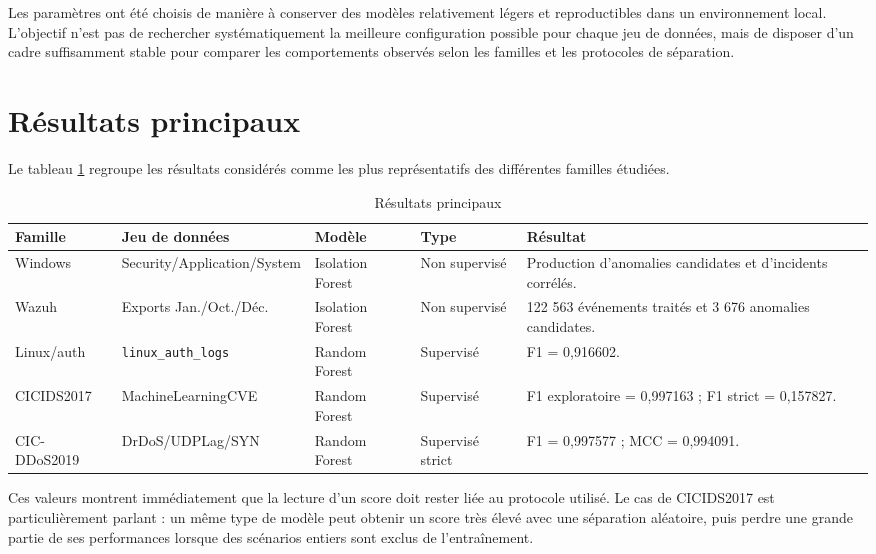 Les paramètres ont été choisis de manière à conserver des modèles relativement légers et reproductibles dans un environnement local. L'objectif n'est pas de rechercher systématiquement la meilleure configuration possible pour chaque jeu de données, mais de disposer d'un cadre suffisamment stable pour comparer les comportements observés selon les familles et les protocoles de séparation.

\section{Résultats principaux}

Le tableau \ref{tab:main-results} regroupe les résultats considérés comme les plus représentatifs des différentes familles étudiées.

\begin{table}[H]
\centering
\caption{Résultats principaux}
\label{tab:main-results}
\scriptsize

\begin{tabularx}{\textwidth}{p{2.2cm}p{2.8cm}p{2.3cm}p{2cm}X}
\toprule
\textbf{Famille} &
\textbf{Jeu de données} &
\textbf{Modèle} &
\textbf{Type} &
\textbf{Résultat}
\tabularnewline
\midrule

Windows &
Security/Application/System &
Isolation Forest &
Non supervisé &
Production d'anomalies candidates et d'incidents corrélés.
\tabularnewline

Wazuh &
Exports Jan./Oct./Déc. &
Isolation Forest &
Non supervisé &
122 563 événements traités et 3 676 anomalies candidates.
\tabularnewline

Linux/auth &
\texttt{linux\_auth\_logs} &
Random Forest &
Supervisé &
F1 = 0,916602.
\tabularnewline

CICIDS2017 &
MachineLearningCVE &
Random Forest &
Supervisé &
F1 exploratoire = 0,997163 ; F1 strict = 0,157827.
\tabularnewline

CIC-DDoS2019 &
DrDoS/UDPLag/SYN &
Random Forest &
Supervisé strict &
F1 = 0,997577 ; MCC = 0,994091.
\tabularnewline

\bottomrule
\end{tabularx}
\end{table}

Ces valeurs montrent immédiatement que la lecture d'un score doit rester liée au protocole utilisé. Le cas de CICIDS2017 est particulièrement parlant : un même type de modèle peut obtenir un score très élevé avec une séparation aléatoire, puis perdre une grande partie de ses performances lorsque des scénarios entiers sont exclus de l'entraînement.

